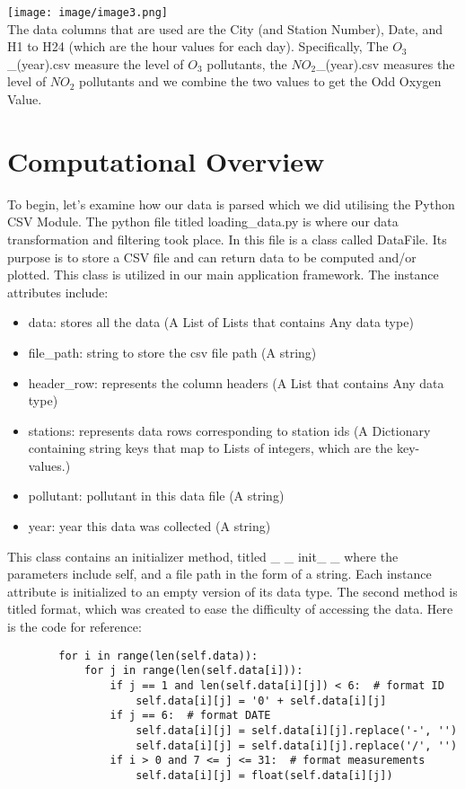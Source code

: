 \documentclass[fontsize=11pt]{article}
\begin{document}
\texttt{[image: image/image3.png]} \\

The data columns that are used are the City (and Station Number), Date, and H1 to H24 (which are the hour values for each day). Specifically, The $O_3$\_(year).csv measure the level of $O_3$ pollutants, the $NO_2$\_(year).csv measures the level of $NO_2$ pollutants and we combine the two values to get the Odd Oxygen Value.

\section*{Computational Overview}


\qquad To begin, let’s examine how our data is parsed which we did utilising the Python CSV Module. The python file titled loading\_data.py is where our data transformation and filtering took place. In this file is a class called DataFile. Its purpose is to store a CSV file and can return data to be computed and/or plotted. This class is utilized in our main application framework. The instance attributes include:

\begin{itemize}
    \item data: stores all the data (A List of Lists that contains Any data type)
    \item file\_path: string to store the csv file path (A string)
    \item header\_row: represents the column headers (A List that contains Any data type)
    \item stations: represents data rows corresponding to station ids (A Dictionary containing string keys that map to Lists of integers, which are the key-values.)
    \item pollutant: pollutant in this data file (A string)
    \item year: year this data was collected  (A string)

\end{itemize}
 This class contains an initializer method, titled  \_ \_ init\_ \_ where the parameters include self, and a file path in the form of a string. Each instance attribute is initialized to an empty version of its data type. The second method is titled format, which was created to ease the difficulty of accessing the data. Here is the code for reference: 
 
 \begin{verbatim}
        for i in range(len(self.data)):
            for j in range(len(self.data[i])):
                if j == 1 and len(self.data[i][j]) < 6:  # format ID
                    self.data[i][j] = '0' + self.data[i][j]
                if j == 6:  # format DATE
                    self.data[i][j] = self.data[i][j].replace('-', '')
                    self.data[i][j] = self.data[i][j].replace('/', '')
                if i > 0 and 7 <= j <= 31:  # format measurements
                    self.data[i][j] = float(self.data[i][j])
 \end{verbatim}
 
\end{document}
